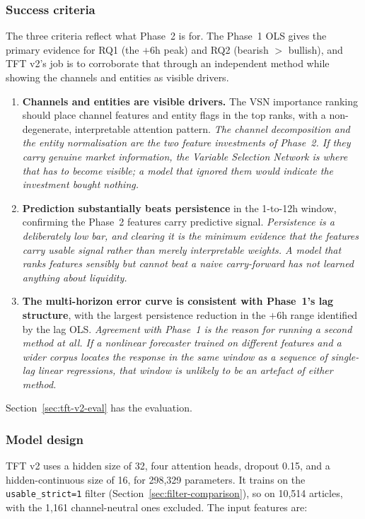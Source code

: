 \subsubsection{Success criteria}\label{sec:tft-v2-criteria}

The three criteria reflect what Phase~2 is for. The Phase~1 OLS gives the primary evidence for RQ1 (the $+6$h peak) and RQ2 (bearish $>$ bullish), and TFT v2's job is to corroborate that through an independent method while showing the channels and entities as visible drivers.

\begin{enumerate}
  \item \textbf{Channels and entities are visible drivers.} The VSN importance ranking should place channel features and entity flags in the top ranks, with a non-degenerate, interpretable attention pattern. \emph{The channel decomposition and the entity normalisation are the two feature investments of Phase~2. If they carry genuine market information, the Variable Selection Network is where that has to become visible; a model that ignored them would indicate the investment bought nothing.}
  \item \textbf{Prediction substantially beats persistence} in the 1-to-12h window, confirming the Phase~2 features carry predictive signal. \emph{Persistence is a deliberately low bar, and clearing it is the minimum evidence that the features carry usable signal rather than merely interpretable weights. A model that ranks features sensibly but cannot beat a naive carry-forward has not learned anything about liquidity.}
  \item \textbf{The multi-horizon error curve is consistent with Phase~1's lag structure}, with the largest persistence reduction in the $+6$h range identified by the lag OLS. \emph{Agreement with Phase~1 is the reason for running a second method at all. If a nonlinear forecaster trained on different features and a wider corpus locates the response in the same window as a sequence of single-lag linear regressions, that window is unlikely to be an artefact of either method.}
\end{enumerate}

Section~\ref{sec:tft-v2-eval} has the evaluation.

\subsubsection{Model design}\label{sec:tft-v2-design}

TFT v2 uses a hidden size of 32, four attention heads, dropout 0.15, and a hidden-continuous size of 16, for 298{,}329 parameters. It trains on the \texttt{usable\_strict=1} filter (Section~\ref{sec:filter-comparison}), so on 10{,}514 articles, with the 1{,}161 channel-neutral ones excluded. The input features are:

